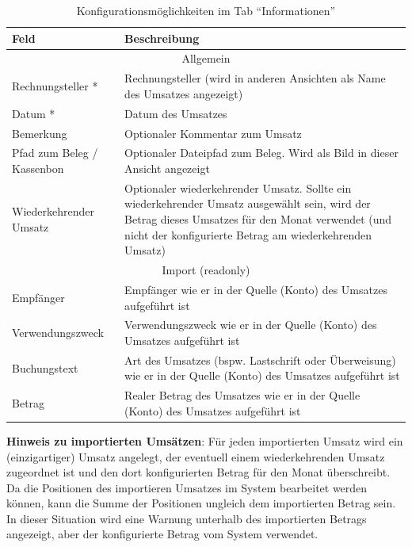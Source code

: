 \renewcommand{\arraystretch}{1.5}
\begin{table}[!ht]
\centering
\begin{tabular}{|p{6cm}|p{8cm}|}
\hline 
\textbf{Feld} & \textbf{Beschreibung} \\ 
\hline 
\hline 
\multicolumn{2}{|c|}{Allgemein} \\ 
\hline 
Rechnungsteller * & Rechnungsteller (wird in anderen Ansichten als Name des Umsatzes angezeigt)  \\ 
\hline 
Datum * & Datum des Umsatzes \\ 
\hline 
Bemerkung & Optionaler Kommentar zum Umsatz \\ 
\hline 
Pfad zum Beleg / Kassenbon & Optionaler Dateipfad zum Beleg. Wird als Bild in dieser Ansicht angezeigt \\ 
\hline 
Wiederkehrender Umsatz & Optionaler wiederkehrender Umsatz. Sollte ein wiederkehrender Umsatz ausgewählt sein, wird der Betrag dieses Umsatzes für den Monat verwendet (und nicht der konfigurierte Betrag am wiederkehrenden Umsatz) \\ 
\hline 
\hline 
\multicolumn{2}{|c|}{Import (readonly)} \\ 
\hline 
Empfänger & Empfänger wie er in der Quelle (Konto) des Umsatzes aufgeführt ist \\
\hline
Verwendungszweck & Verwendungszweck wie er in der Quelle (Konto) des Umsatzes aufgeführt ist \\
\hline 
Buchungstext & Art des Umsatzes (bspw. Lastschrift oder Überweisung) wie er in der Quelle (Konto) des Umsatzes aufgeführt ist \\
\hline 
Betrag & Realer Betrag des Umsatzes wie er in der Quelle (Konto) des Umsatzes aufgeführt ist \\
\hline 
\end{tabular} 
\caption{Konfigurationsmöglichkeiten im Tab "`Informationen"'}
\label{tab:uniqueTurnoverInfoTab}
\end{table}
\renewcommand{\arraystretch}{1.0}

\begin{infobox}
\textbf{Hinweis zu importierten Umsätzen}: Für jeden importierten Umsatz wird ein (einzigartiger) Umsatz angelegt, der eventuell einem wiederkehrenden Umsatz zugeordnet ist und den dort konfigurierten Betrag für den Monat überschreibt. Da die Positionen des importieren Umsatzes im System bearbeitet werden können, kann die Summe der Positionen ungleich dem importierten Betrag sein. In dieser Situation wird eine Warnung unterhalb des importierten Betrags angezeigt, aber der konfigurierte Betrag vom System verwendet. 
\end{infobox}

